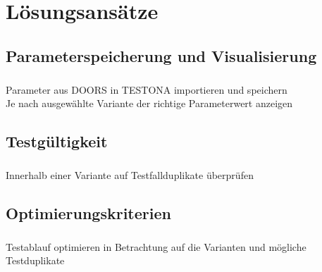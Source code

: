 \chapter{Lösungsansätze}\label{chp:loesungsansaetze}




\section{Parameterspeicherung und Visualisierung}
\paragraph{}
Parameter aus DOORS in TESTONA importieren und speichern\\
Je nach ausgewählte Variante der richtige Parameterwert anzeigen\\
\newpage
\section{Testgültigkeit}
\paragraph{}
Innerhalb einer Variante auf Testfallduplikate überprüfen

\newpage
\section{Optimierungskriterien}
\paragraph{}
Testablauf optimieren in Betrachtung auf die Varianten und mögliche Testduplikate